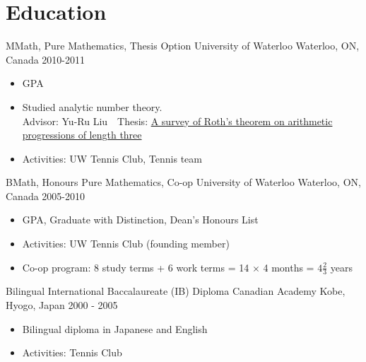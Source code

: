 \section{Education}
\cventry
  {MMath, Pure Mathematics, Thesis Option} %
  {University of Waterloo} %
  {Waterloo, ON, Canada} %
  {2010-2011} %
  {
    \begin{itemize} %
      \liststyle
      \item {GPA}
      \item {Studied analytic number theory.\\
        Advisor: Yu-Ru Liu\ \ Thesis: \href{http://hdl.handle.net/10012/6406}{A survey of Roth's theorem on arithmetic progressions of length three}}
      \item {Activities: UW Tennis Club, Tennis team}
    \end{itemize}
  }

\cventry
  {BMath, Honours Pure Mathematics, Co-op} %
  {University of Waterloo} %
  {Waterloo, ON, Canada} %
  {2005-2010} %
  {
    \begin{itemize} %
      \liststyle
      \item {GPA, Graduate with Distinction, Dean's Honours List}
      \item {Activities: UW Tennis Club (founding member)}
      \item {Co-op program: 8 study terms + 6 work terms = 14 $\times$ 4 months = $4 \frac{2}{3}$ years}
    \end{itemize}
  }

\cventry
  {Bilingual International Baccalaureate (IB) Diploma} %
  {Canadian Academy} %
  {Kobe, Hyogo, Japan} %
  {2000 - 2005} %
  {
    \begin{itemize} %
      \liststyle
      \item {Bilingual diploma in Japanese and English}
      \item {Activities: Tennis Club}
    \end{itemize}
  }
